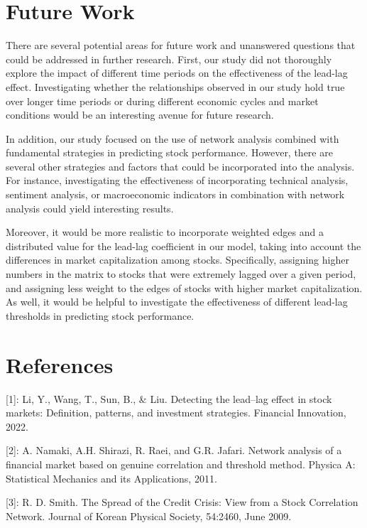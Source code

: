 \documentclass{article}
\begin{document}
\section{Future Work}
There are several potential areas for future work and unanswered questions that could be addressed in further research. First, our study did not thoroughly explore the impact of different time periods on the effectiveness of the lead-lag effect. Investigating whether the relationships observed in our study hold true over longer time periods or during different economic cycles and market conditions would be an interesting avenue for future research.

In addition, our study focused on the use of network analysis combined with fundamental strategies in predicting stock performance. However, there are several other strategies and factors that could be incorporated into the analysis. For instance, investigating the effectiveness of incorporating technical analysis, sentiment analysis, or macroeconomic indicators in combination with network analysis could yield interesting results. 

Moreover, it would be more realistic to incorporate weighted edges and a distributed value for the lead-lag coefficient in our model, taking into account the differences in market capitalization among stocks. Specifically, assigning higher numbers in the matrix to stocks that were extremely lagged over a given period, and assigning less weight to the edges of stocks with higher market capitalization. As well, it would be helpful to investigate the effectiveness of different lead-lag thresholds in predicting stock performance.

\section*{References}
[1]: Li, Y., Wang, T., Sun, B., \& Liu. Detecting the lead–lag effect in stock markets: Definition, patterns, and investment strategies. Financial Innovation, 2022.

[2]: A. Namaki, A.H. Shirazi, R. Raei, and G.R. Jafari. Network analysis of a financial market based on genuine correlation and threshold method. Physica A: Statistical
Mechanics and its Applications, 2011.

[3]: R. D. Smith. The Spread of the Credit Crisis: View
from a Stock Correlation Network. Journal of Korean
Physical Society, 54:2460, June 2009.

\medskip
\small
\end{document}
